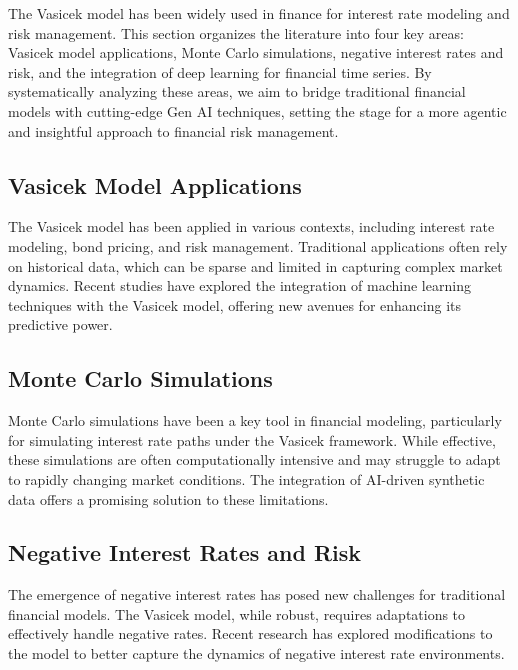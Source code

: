 \documentclass[a4paper,12pt]{scrbook}
\begin{document}
	
	The Vasicek model has been widely used in finance for interest rate modeling and risk management. This section organizes the literature into four key areas: Vasicek model applications, Monte Carlo simulations, negative interest rates and risk, and the integration of deep learning for financial time series. By systematically analyzing these areas, we aim to bridge traditional financial models with cutting-edge Gen AI techniques, setting the stage for a more agentic and insightful approach to financial risk management.
	
	\subsection{Vasicek Model Applications}
	
	The Vasicek model has been applied in various contexts, including interest rate modeling, bond pricing, and risk management. Traditional applications often rely on historical data, which can be sparse and limited in capturing complex market dynamics. Recent studies have explored the integration of machine learning techniques with the Vasicek model, offering new avenues for enhancing its predictive power.
	
	\subsection{Monte Carlo Simulations}
	
	Monte Carlo simulations have been a key tool in financial modeling, particularly for simulating interest rate paths under the Vasicek framework. While effective, these simulations are often computationally intensive and may struggle to adapt to rapidly changing market conditions. The integration of AI-driven synthetic data offers a promising solution to these limitations.
	
	\subsection{Negative Interest Rates and Risk}
	
	The emergence of negative interest rates has posed new challenges for traditional financial models. The Vasicek model, while robust, requires adaptations to effectively handle negative rates. Recent research has explored modifications to the model to better capture the dynamics of negative interest rate environments.
	
\end{document}
